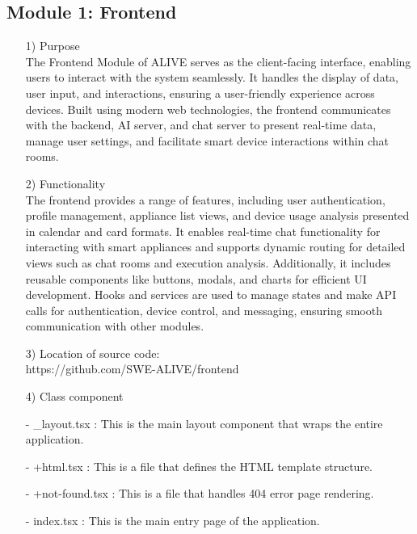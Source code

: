 \documentclass[conference]{IEEEtran}
\begin{document}
\subsection{Module 1: Frontend}
\begin{enumerate}
    \item[1)] Purpose\\
    The Frontend Module of ALIVE serves as the client-facing interface, enabling users to interact with the system seamlessly. It handles the display of data, user input, and interactions, ensuring a user-friendly experience across devices. Built using modern web technologies, the frontend communicates with the backend, AI server, and chat server to present real-time data, manage user settings, and facilitate smart device interactions within chat rooms. \\ 
    \item[2)] Functionality \\
    The frontend provides a range of features, including user authentication, profile management, appliance list views, and device usage analysis presented in calendar and card formats. It enables real-time chat functionality for interacting with smart appliances and supports dynamic routing for detailed views such as chat rooms and execution analysis. Additionally, it includes reusable components like buttons, modals, and charts for efficient UI development. Hooks and services are used to manage states and make API calls for authentication, device control, and messaging, ensuring smooth communication with other modules. \\
    
    \item[3)] Location of source code:\\ https://github.com/SWE-ALIVE/frontend \\
    
    \item[4)] Class component
        \item[-] \_layout.tsx : This is the main layout component that wraps the entire application.\\
        \item[-] +html.tsx : This is a file that defines the HTML template structure.\\
        \item[-] +not-found.tsx : This is a file that handles 404 error page rendering.\\
        \item[-] index.tsx : This is the main entry page of the application.\\
        

\end{enumerate}
\end{document}
